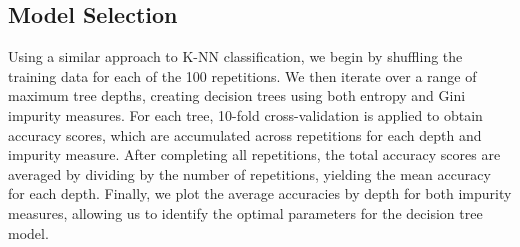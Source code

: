 \documentclass{article}
\begin{document}
    \subsection*{Model Selection}

    Using a similar approach to K-NN classification, we begin by shuffling the training data
    for each of the 100 repetitions. We then iterate over a range of maximum tree depths,
    creating decision trees using both entropy and Gini impurity measures. For each tree,
    10-fold cross-validation is applied to obtain accuracy scores, which are accumulated
    across repetitions for each depth and impurity measure. After completing all repetitions,
    the total accuracy scores are averaged by dividing by the number of repetitions,
    yielding the mean accuracy for each depth. Finally, we plot the average accuracies
    by depth for both impurity measures, allowing us to identify the optimal parameters for
    the decision tree model.
\end{document}

